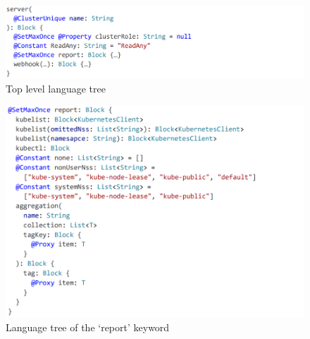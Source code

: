\begin{figure}[h]
  \centering
  \includegraphics[width=150mm, keepaspectratio]{tree_1.png}
  \caption{Top level language tree}
  \label{fig:fltree_1}
\end{figure}


\begin{figure}[h]
  \centering
  \includegraphics[width=150mm, keepaspectratio]{tree_2.png}
  \caption{Language tree of the `report' keyword}
  \label{fig:fltree_2}
\end{figure}

